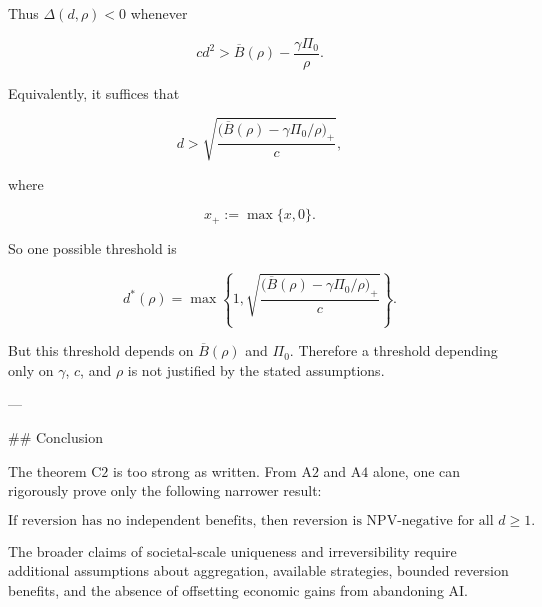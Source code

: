Thus \(\Delta(d,\rho)<0\) whenever

\[
c d^2
>
\overline B(\rho)
-
\frac{\gamma \Pi_0}{\rho}.
\]

Equivalently, it suffices that

\[
d>
\sqrt{
\frac{
\bigl(\overline B(\rho)-\gamma\Pi_0/\rho\bigr)_+
}{c}
},
\]

where

\[
x_+ := \max\{x,0\}.
\]

So one possible threshold is

\[
d^*(\rho)
=
\max\left\{
1,
\sqrt{
\frac{
\bigl(\overline B(\rho)-\gamma\Pi_0/\rho\bigr)_+
}{c}
}
\right\}.
\]

But this threshold depends on \(\overline B(\rho)\) and \(\Pi_0\). Therefore a threshold depending only on \(\gamma\), \(c\), and \(\rho\) is not justified by the stated assumptions.

---

## Conclusion

The theorem \(\mathrm{C2}\) is too strong as written. From \(\mathrm{A2}\) and \(\mathrm{A4}\) alone, one can rigorously prove only the following narrower result:

\[
\text{If reversion has no independent benefits, then reversion is NPV-negative for all } d\ge 1.
\]

The broader claims of societal-scale uniqueness and irreversibility require additional assumptions about aggregation, available strategies, bounded reversion benefits, and the absence of offsetting economic gains from abandoning AI.